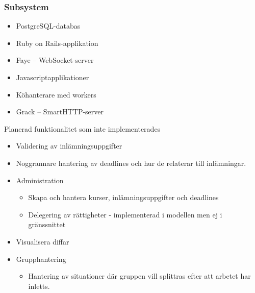 \subsubsection{Subsystem}

\begin{itemize}
  \item PostgreSQL-databas
  \item Ruby on Rails-applikation
  \item Faye – WebSocket-server
  \item Javascriptapplikationer
  \item Köhanterare med workers
  \item Grack – SmartHTTP-server
\end{itemize}

Planerad funktionalitet som inte implementerades

\begin{itemize}
  \item Validering av inlämningsuppgifter
  \item Noggrannare hantering av deadlines och hur de relaterar till inlämningar.
  \item Administration  
  \begin{itemize}
    \item Skapa och hantera kurser, inlämningsuppgifter och deadlines
    \item Delegering av rättigheter - implementerad i modellen men ej i gränssnittet
  \end{itemize}
  \item Visualisera diffar
  \item Grupphantering
  \begin{itemize}
    \item Hantering av situationer där gruppen vill splittras efter att arbetet har inletts.
  \end{itemize}
\end{itemize}
